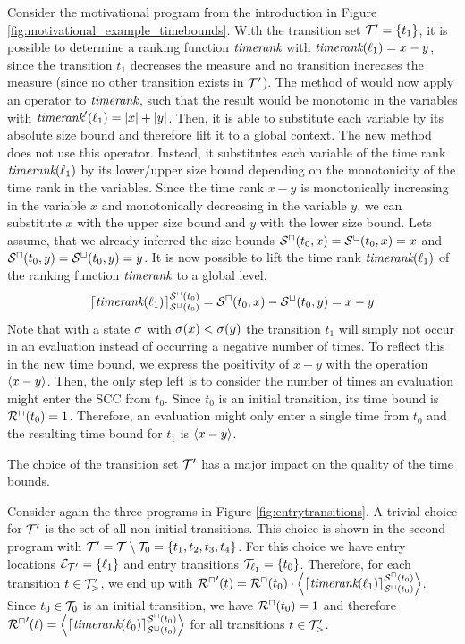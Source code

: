 \begin{example}
  
  Consider the motivational program from the introduction in Figure \ref{fig:motivational_example_timebounds}.
  With the transition set $\mathcal{T}' = \lbrace t_1 \rbrace$, it is possible to determine a ranking function $\emph{timerank}$ with $\emph{timerank}(\ell_1) = x - y$, since the transition $t_1$ decreases the measure and no transition increases the measure (since no other transition exists in $\mathcal{T}'$).
  The method of \cite{koat} would now apply an operator to $\emph{timerank}$, such that the result would be monotonic in the variables with $\emph{timerank}'(\ell_1) = \left|x\right| + \left|y\right|$.
  Then, it is able to substitute each variable by its absolute size bound and therefore lift it to a global context.
  The new method does not use this operator.
  Instead, it substitutes each variable of the time rank $\emph{timerank}(\ell_1)$ by its lower/upper size bound depending on the monotonicity of the time rank in the variables.
  Since the time rank $x-y$ is monotonically increasing in the variable $x$ and monotonically decreasing in the variable $y$, we can substitute $x$ with the upper size bound and $y$ with the lower size bound.
  Lets assume, that we already inferred the size bounds ${\mathcal{S}^\sqcap}(t_0,x) = {\mathcal{S}^\sqcup}(t_0,x) = x$ and ${\mathcal{S}^\sqcap}(t_0,y) = {\mathcal{S}^\sqcup}(t_0,y) = y$.
  It is now possible to lift the time rank $\emph{timerank}(\ell_1)$ of the ranking function $\emph{timerank}$ to a global level.
  \[ \left\lceil \emph{timerank}(\ell_1) \right\rceil^{{\mathcal{S}^\sqcap}(t_0)}_{{\mathcal{S}^\sqcup}(t_0)} = {\mathcal{S}^\sqcap}(t_0, x) - {\mathcal{S}^\sqcup}(t_0, y) = x - y \]
  Note that with a state $\sigma$ with $\sigma(x) < \sigma(y)$ the transition $t_1$ will simply not occur in an evaluation instead of occurring a negative number of times.
  To reflect this in the new time bound, we express the positivity of $x - y$ with the operation $\left\langle x - y \right\rangle$.
  Then, the only step left is to consider the number of times an evaluation might enter the SCC from $t_0$.
  Since $t_0$ is an initial transition, its time bound is ${\mathcal{R}^\sqcap}(t_0) = 1$.
  Therefore, an evaluation might only enter a single time from $t_0$ and the resulting time bound for $t_1$ is $\left\langle x - y \right\rangle$.
\end{example}

The choice of the transition set $\mathcal{T}'$ has a major impact on the quality of the time bounds.

Consider again the three programs in Figure \ref{fig:entrytransitions}.
A trivial choice for $\mathcal{T}'$ is the set of all non-initial transitions.
This choice is shown in the second program with $\mathcal{T}' = \mathcal{T} \setminus \mathcal{T}_0 = \lbrace t_1, t_2, t_3, t_4 \rbrace$.
For this choice we have entry locations $\mathcal{E}_{\mathcal{T}'} = \lbrace \ell_1 \rbrace$ and entry transitions $\mathcal{T}_{\ell_1} = \lbrace t_0 \rbrace$.
Therefore, for each transition $t \in \mathcal{T}'_>$, we end up with ${\mathcal{R}^\sqcap}'(t) = {\mathcal{R}^\sqcap}(t_0) \cdot \left\langle \left\lceil \emph{timerank}(\ell_1) \right\rceil^{{\mathcal{S}^\sqcap}(t_0)}_{{\mathcal{S}^\sqcup}(t_0)} \right\rangle$.
Since $t_0 \in \mathcal{T}_0$ is an initial transition, we have ${\mathcal{R}^\sqcap}(t_0) = 1$ and therefore ${\mathcal{R}^\sqcap}'(t) = \left\langle \left\lceil \emph{timerank}(\ell_0) \right\rceil^{{\mathcal{S}^\sqcap}(t_0)}_{{\mathcal{S}^\sqcup}(t_0)} \right\rangle$ for all transitions $t \in \mathcal{T}'_>$.

